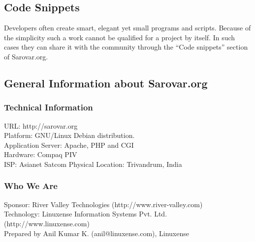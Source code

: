\documentclass{article}
\begin{document}
\subsection{Code Snippets}

Developers often create smart, elegant yet small programs and scripts.
Because of the simplicity such a work cannot be qualified for a
project by itself. In such cases they can share it with the community
through the ``Code snippets'' section of Sarovar.org.

\subsection{General Information about Sarovar.org}

\subsubsection{Technical Information}
URL: http://sarovar.org\\
Platform: GNU/Linux Debian distribution.\\
Application Server: Apache, PHP and CGI\\
Hardware: Compaq PIV\\
ISP: Asianet Satcom Physical Location: Trivandrum, India

\subsubsection{Who We Are\label{1}}
Sponsor: River Valley Technologies (http://www.river-valley.com)\\
Technology: Linuxense Information Systems
Pvt. Ltd. (http://www.linuxense.com)\\


\hfill Prepared by Anil Kumar K. (anil@linuxense.com), Linuxense
\end{document}
